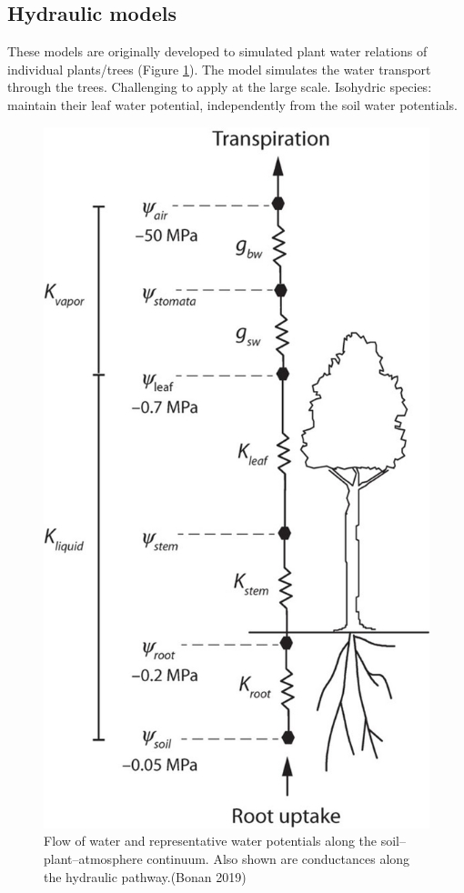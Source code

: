 \documentclass[
  12pt,
  oneside]{book}
\begin{document}
\hypertarget{hydraulic-models}{%
\subsection{Hydraulic models}\label{hydraulic-models}}

These models are originally developed to simulated plant water relations of individual plants/trees (Figure \ref{fig:f218}). The model simulates the water transport through the trees. Challenging to apply at the large scale.
Isohydric species: maintain their leaf water potential, independently from the soil water potentials.

\begin{figure}

{\centering \includegraphics[width=0.8\linewidth]{figures/chap2/hydraulics} 

}

\caption{Flow of water and representative water potentials along the soil–plant–atmosphere continuum. Also shown are conductances along the hydraulic pathway.(Bonan 2019)}\label{fig:f218}
\end{figure}
\end{document}
